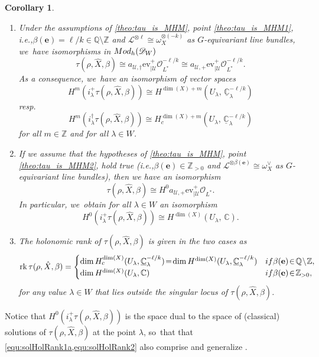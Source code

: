 \documentclass[11pt]{article}
\newcommand{\ie}{i.e.,\xspace}
\newcommand{\resp}{resp.\xspace}
\newcommand{\skpt}{\smallskip}
\let\mathds\mathbb
\newcommand{\bme}{{\boldsymbol{e}}}
\newcommand{\ev}{\mathrm{ev}}
\newtheorem{cor}[thm]{Corollary}
\newcommand{\dC}{{\mathds C}}\let\C\dC
\newcommand{\dQ}{{\mathds Q}}\let\Q\dQ
\newcommand{\dZ}{{\mathds Z}}\let\mbz\dZ\let\Z\dZ
\newcommand{\Ell}{\mathscr{L}}
\newcommand{\cO}{\mathcal{O}}\let\O\cO
\newcommand{\cU}{\mathcal{U}}\let\mcu\cU
\DeclareMathOperator{\rk}{rk}
\begin{document}
\skpt
\begin{cor}\label{cor:holRankProb}
\begin{enumerate}
\item
Under the assumptions of \cref{theo:tau_is_MHM}, point \eqref{theo:tau_is_MHM1}, \ie $\beta(\bme) =\ell/k\in\dQ\setminus\dZ$ and $\Ell^{\otimes \ell} \cong \omega_X^{\otimes (-k)}$ as $G$-equivariant line bundles, we~have isomorphisms in $\textup{Mod}_h(\mathscr{D}_W)$
\[
\tau(\rho,\hat X, \beta) \cong a_{\cU,\dag} {\ev_{|\cU}^+}\cO_{L^*}^{-\ell/k} \cong a_{\cU,+} {\ev_{|\cU}^+}\cO_{L^*}^{-\ell/k}.
\]
As a consequence, we~have an isomorphism of vector spaces
\begin{equation}\label{equ:solHolRank1a}
H^m (i_\lambda^+ \tau(\rho, \hat X, \beta)) \cong H^{\dim(X) +m}(U_\lambda,\,\underline{\dC}^{-\ell/k}_\lambda)
\end{equation}
\resp
\begin{equation}\label{equ:solHolRank1b}
H^m (i_\lambda^\dag \tau(\rho, \hat X, \beta)) \cong H_c^{\dim(X) + m}(U_\lambda,\,\underline{\dC}^{-\ell/k}_\lambda)
\end{equation}
for all $m \in \Z$ and for all $\lambda\in W$.
\item
If we assume that the hypotheses of \cref{theo:tau_is_MHM}, point \eqref{theo:tau_is_MHM2}, hold true (\ie $\beta(\bme)\in \dZ_{>0}$ and $\Ell^{\otimes \beta(\bme)} \cong \omega_X^\vee$ as $G$-equivariant line bundles), then we have an isomorphism
\[
\tau(\rho,\hat X, \beta) \cong H^0 a_{\cU,+} {\ev_{|\cU}^+}\cO_{L^*}.
\]
In particular, we~obtain for all $\lambda\in W$ an isomorphism
\begin{equation}\label{equ:solHolRank2}
H^0 (i_\lambda^+ \tau(\rho, \hat X, \beta)) \cong H^{\dim(X)}(U_\lambda,\,\dC).
\end{equation}

\item The holonomic rank of $\tau(\rho,\hat X, \beta)$ is given in the two cases as
\[
\rk \tau(\rho, \hat X, \beta) =
\begin{cases}
\dim H_c^{\dim(X)}(U_\lambda, \underline{\dC}_\lambda^{-\ell/k})\!=\!
\dim H^{\dim(X)}(U_\lambda, \underline{\dC}_\lambda^{-\ell/k}) &
\textup{if } \beta(\mathbf{e})\!\in\!\dQ\!\setminus\!\dZ,\\
\dim H^{\dim(X)}(U_\lambda, \dC)  & \textup{if }\beta(\mathbf{e})\!\in\!\dZ_{>0},
\end{cases}
\]
for any value $\lambda\in W$ that lies outside the singular locus of $\tau(\rho,\hat X, \beta)$. \end{enumerate}
\end{cor}
Notice that $H^0 (i_\lambda^+ \tau(\rho, \hat X, \beta))$ is the space dual to the space of (classical) solutions of $\tau(\rho, \hat{X},\beta)$ at the point $\lambda$, so~that that \cref{equ:solHolRank1a,equ:solHolRank2} also comprise and generalize \cite[Cor.\,2.3]{HuangLianZhu}.
\end{document}

